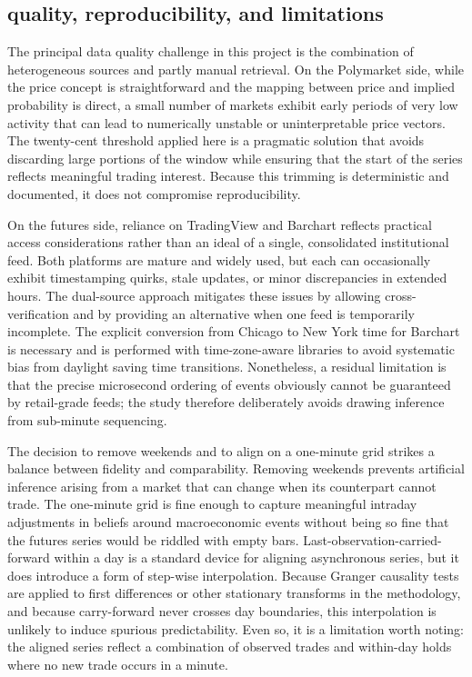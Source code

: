 \subsection{quality, reproducibility, and limitations}

The principal data quality challenge in this project is the combination of heterogeneous sources and partly manual retrieval. On the Polymarket side, while the price concept is straightforward and the mapping between price and implied probability is direct, a small number of markets exhibit early periods of very low activity that can lead to numerically unstable or uninterpretable price vectors. The twenty-cent threshold applied here is a pragmatic solution that avoids discarding large portions of the window while ensuring that the start of the series reflects meaningful trading interest. Because this trimming is deterministic and documented, it does not compromise reproducibility.

On the futures side, reliance on TradingView and Barchart reflects practical access considerations rather than an ideal of a single, consolidated institutional feed. Both platforms are mature and widely used, but each can occasionally exhibit timestamping quirks, stale updates, or minor discrepancies in extended hours. The dual-source approach mitigates these issues by allowing cross-verification and by providing an alternative when one feed is temporarily incomplete. The explicit conversion from Chicago to New York time for Barchart is necessary and is performed with time-zone-aware libraries to avoid systematic bias from daylight saving time transitions. Nonetheless, a residual limitation is that the precise microsecond ordering of events obviously cannot be guaranteed by retail-grade feeds; the study therefore deliberately avoids drawing inference from sub-minute sequencing.

The decision to remove weekends and to align on a one-minute grid strikes a balance between fidelity and comparability. Removing weekends prevents artificial inference arising from a market that can change when its counterpart cannot trade. The one-minute grid is fine enough to capture meaningful intraday adjustments in beliefs around macroeconomic events without being so fine that the futures series would be riddled with empty bars. Last-observation-carried-forward within a day is a standard device for aligning asynchronous series, but it does introduce a form of step-wise interpolation. Because Granger causality tests are applied to first differences or other stationary transforms in the methodology, and because carry-forward never crosses day boundaries, this interpolation is unlikely to induce spurious predictability. Even so, it is a limitation worth noting: the aligned series reflect a combination of observed trades and within-day holds where no new trade occurs in a minute.

